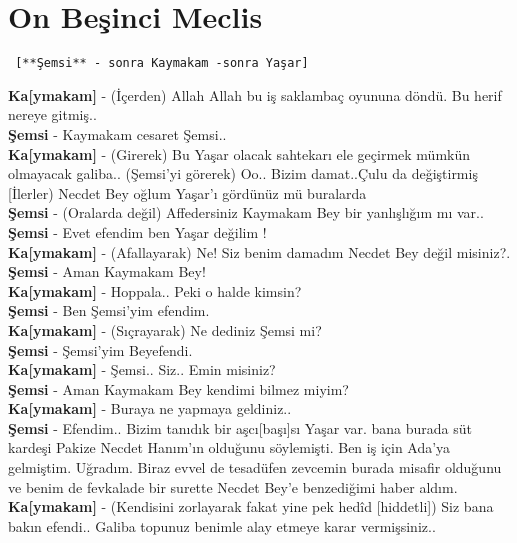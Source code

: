 \documentclass[]{book}
\begin{document}
\hypertarget{on-besinci-meclis-2}{%
\section{On Beşinci Meclis}\label{on-besinci-meclis-2}}

\begin{verbatim}
 [**Şemsi** - sonra Kaymakam -sonra Yaşar]
\end{verbatim}

\textbf{Ka{[}ymakam{]}} - (İçerden) Allah Allah bu iş saklambaç oyununa döndü. Bu herif nereye gitmiş..\\
\textbf{Şemsi} - Kaymakam cesaret Şemsi..\\
\textbf{Ka{[}ymakam{]}} - (Girerek) Bu Yaşar olacak sahtekarı ele geçirmek mümkün olmayacak galiba.. (Şemsi'yi görerek) Oo.. Bizim damat..Çulu da değiştirmiş {[}İlerler) Necdet Bey oğlum Yaşar'ı gördünüz mü buralarda\\
\textbf{Şemsi} - (Oralarda değil) Affedersiniz Kaymakam Bey bir yanlışlığım mı var..\\
\textbf{Şemsi} - Evet efendim ben Yaşar değilim !\\
\textbf{Ka{[}ymakam{]}} - (Afallayarak) Ne! Siz benim damadım Necdet Bey değil misiniz?.\\
\textbf{Şemsi} - Aman Kaymakam Bey!\\
\textbf{Ka{[}ymakam{]}} - Hoppala.. Peki o halde kimsin?\\
\textbf{Şemsi} - Ben Şemsi'yim efendim.\\
\textbf{Ka{[}ymakam{]}} - (Sıçrayarak) Ne dediniz Şemsi mi?\\
\textbf{Şemsi} - Şemsi'yim Beyefendi.\\
\textbf{Ka{[}ymakam{]}} - Şemsi.. Siz.. Emin misiniz?\\
\textbf{Şemsi} - Aman Kaymakam Bey kendimi bilmez miyim?\\
\textbf{Ka{[}ymakam{]}} - Buraya ne yapmaya geldiniz..\\
\textbf{Şemsi} - Efendim.. Bizim tanıdık bir aşcı{[}başı{]}sı Yaşar var. bana burada süt kardeşi Pakize Necdet Hanım'ın olduğunu söylemişti. Ben iş için Ada'ya gelmiştim. Uğradım. Biraz evvel de tesadüfen zevcemin burada misafir olduğunu ve benim de fevkalade bir surette Necdet Bey'e benzediğimi haber aldım.\\
\textbf{Ka{[}ymakam{]}} - (Kendisini zorlayarak fakat yine pek hedîd {[}hiddetli{]}) Siz bana bakın efendi.. Galiba topunuz benimle alay etmeye karar vermişsiniz..\\
\end{document}
